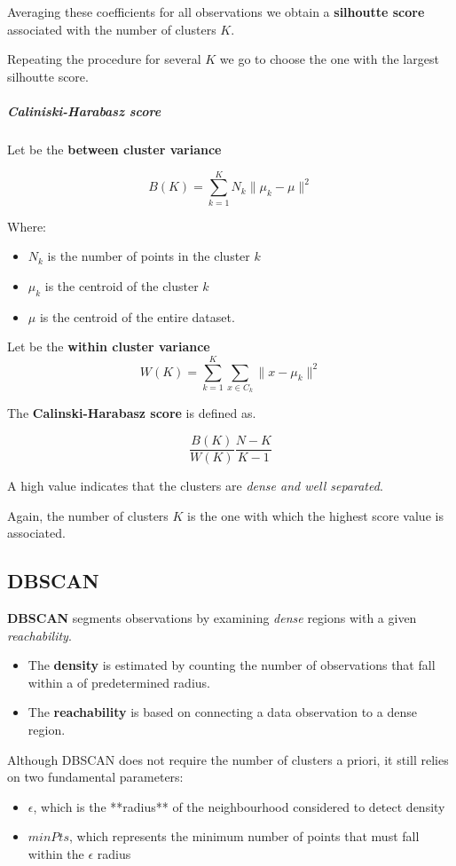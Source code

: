 Averaging these coefficients for all observations we obtain a \textbf{silhoutte score} associated with the number of clusters $K$. 

Repeating the procedure for several $K$ we go to choose the one with the largest silhoutte score.
\subparagraph*{Caliniski-Harabasz score}

Let be the \textbf{between cluster variance}

\[
    B(K)=\sum_{k=1}^KN_k\|\mu_k-\mu\|^2
\]

Where:
\begin{itemize}
    \item $N_k$ is the number of points in the cluster $k$
    \item $\mu_k$ is the centroid of the cluster $k$
    \item $\mu$ is the centroid of the entire dataset.
\end{itemize}

Let be the \textbf{within cluster variance}
\[
    W(K)=\sum_{k=1}^K\sum_{x\in C_k}\|x-\mu_k\|^2
\]

The \textbf{Calinski-Harabasz score} is defined as.

\[
    \frac{B(K)}{W(K)}\frac{N-K}{K-1}
\]

A high value indicates that the clusters are \textit{dense and well separated}.

Again, the number of clusters $K$ is the one with which the highest score value is associated.

\subsection{DBSCAN}
\textbf{DBSCAN} segments observations by examining \textit{dense} regions with a given \textit{reachability}.

\begin{itemize}
    \item The \textbf{density} is estimated by counting the number of observations that fall within a of predetermined radius.
    \item The \textbf{reachability} is based on connecting a data observation to a dense region. 
\end{itemize}

Although DBSCAN does not require the number of clusters a priori, it still relies on two fundamental parameters:
\begin{itemize}
    \item $\epsilon$, which is the **radius** of the neighbourhood considered to detect density
    \item $minPts$, which represents the minimum number of points that must fall within the $\epsilon$ radius
\end{itemize}

